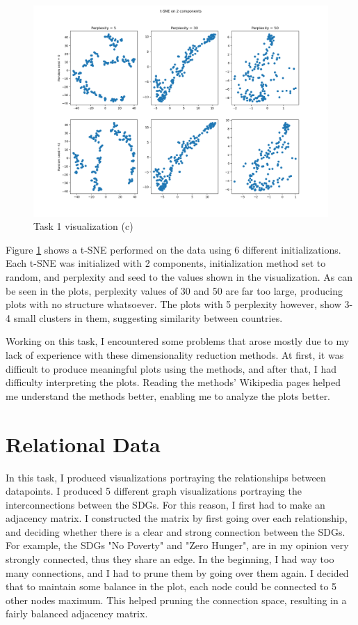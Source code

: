 \documentclass[11pt,a4paper,titlepage]{article}
\begin{document}
\begin{figure}[h!]
    \centering
    \includegraphics[width=1.0\linewidth]{reports/assignment-4/imgs/tsne.png}
    \caption{Task 1 visualization (c)}
    \label{fig:tsne}
\end{figure}

\newpage

Figure \ref{fig:tsne} shows a t-SNE performed on the data using 6 different initializations. Each t-SNE was initialized with 2 components, initialization method set to random, and perplexity and seed to the values shown in the visualization. As can be seen in the plots, perplexity values of 30 and 50 are far too large, producing plots with no structure whatsoever. The plots with 5 perplexity however, show 3-4 small clusters in them, suggesting similarity between countries.

Working on this task, I encountered some problems that arose mostly due to my lack of experience with these dimensionality reduction methods. At first, it was difficult to produce meaningful plots using the methods, and after that, I had difficulty interpreting the plots. Reading the methods' Wikipedia pages helped me understand the methods better, enabling me to analyze the plots better.

\section{Relational Data}

In this task, I produced visualizations portraying the relationships between datapoints. I produced 5 different graph visualizations portraying the interconnections between the SDGs. For this reason, I first had to make an adjacency matrix. I constructed the matrix by first going over each relationship, and deciding whether there is a clear and strong connection between the SDGs. For example, the SDGs "No Poverty" and "Zero Hunger", are in my opinion very strongly connected, thus they share an edge. In the beginning, I had way too many connections, and I had to prune them by going over them again. I decided that to maintain some balance in the plot, each node could be connected to 5 other nodes maximum. This helped pruning the connection space, resulting in a fairly balanced adjacency matrix.
\end{document}
